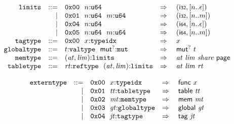 \vspace{1ex}

$$
\begin{array}[t]{@{}lrrl@{}l@{}l@{}l@{}}
& {\mathtt{limits}} & ::= & \mathtt{0x00}~~n{:}{\mathtt{u64}} & \quad\Rightarrow\quad{} & (\mathsf{i{\scriptstyle 32}}, {}[ n .. \epsilon ]) \\
& & | & \mathtt{0x01}~~n{:}{\mathtt{u64}}~~m{:}{\mathtt{u64}} & \quad\Rightarrow\quad{} & (\mathsf{i{\scriptstyle 32}}, {}[ n .. m ]) \\
& & | & \mathtt{0x04}~~n{:}{\mathtt{u64}} & \quad\Rightarrow\quad{} & (\mathsf{i{\scriptstyle 64}}, {}[ n .. \epsilon ]) \\
& & | & \mathtt{0x05}~~n{:}{\mathtt{u64}}~~m{:}{\mathtt{u64}} & \quad\Rightarrow\quad{} & (\mathsf{i{\scriptstyle 64}}, {}[ n .. m ]) \\
& {\mathtt{tagtype}} & ::= & \mathtt{0x00}~~x{:}{\mathtt{typeidx}} & \quad\Rightarrow\quad{} & x \\
& {\mathtt{globaltype}} & ::= & t{:}{\mathtt{valtype}}~~{\mathsf{mut}^?}{:}{\mathtt{mut}} & \quad\Rightarrow\quad{} & {\mathsf{mut}^?}~t \\
& {\mathtt{memtype}} & ::= & ({\mathit{at}}, {\mathit{lim}}){:}{\mathtt{limits}} & \quad\Rightarrow\quad{} & {\mathit{at}}~{\mathit{lim}}~{\mathit{share}}~\mathsf{page} \\
& {\mathtt{tabletype}} & ::= & {\mathit{rt}}{:}{\mathtt{reftype}}~~({\mathit{at}}, {\mathit{lim}}){:}{\mathtt{limits}} & \quad\Rightarrow\quad{} & {\mathit{at}}~{\mathit{lim}}~{\mathit{rt}} \\
\end{array}
$$

\vspace{1ex}

$$
\begin{array}[t]{@{}lrrl@{}l@{}l@{}l@{}}
& {\mathtt{externtype}} & ::= & \mathtt{0x00}~~x{:}{\mathtt{typeidx}} & \quad\Rightarrow\quad{} & \mathsf{func}~x \\
& & | & \mathtt{0x01}~~{\mathit{tt}}{:}{\mathtt{tabletype}} & \quad\Rightarrow\quad{} & \mathsf{table}~{\mathit{tt}} \\
& & | & \mathtt{0x02}~~{\mathit{mt}}{:}{\mathtt{memtype}} & \quad\Rightarrow\quad{} & \mathsf{mem}~{\mathit{mt}} \\
& & | & \mathtt{0x03}~~{\mathit{gt}}{:}{\mathtt{globaltype}} & \quad\Rightarrow\quad{} & \mathsf{global}~{\mathit{gt}} \\
& & | & \mathtt{0x04}~~{\mathit{jt}}{:}{\mathtt{tagtype}} & \quad\Rightarrow\quad{} & \mathsf{tag}~{\mathit{jt}} \\
\end{array}
$$

